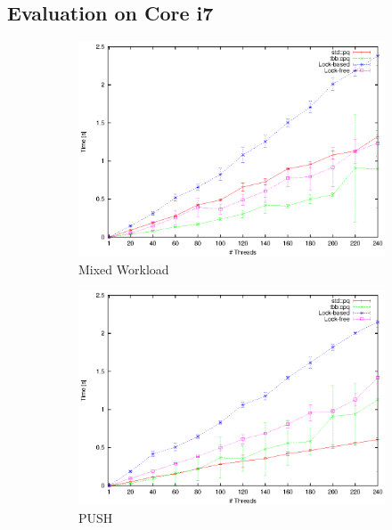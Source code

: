 \subsection{Evaluation on Core i7}
\begin{figure}[t]
	\centering
	\begin{subfigure}[b]{0.3\textwidth}
		\centering
		\includegraphics[width=\textwidth]{../plots/i7_mixed/runtime_mixed_i7}
		\caption{Mixed Workload}
		\label{fig:i7_mixed}
	\end{subfigure}
	\hfill
	\begin{subfigure}[b]{0.3\textwidth}
		\centering
		\includegraphics[width=\textwidth]{../plots/i7_push/runtime_push_i7}
		\caption{PUSH}
		\label{fig:i7_push}
	\end{subfigure}
	\hfill
	\begin{subfigure}[b]{0.3\textwidth}

\end{subfigure}
\end{figure}
